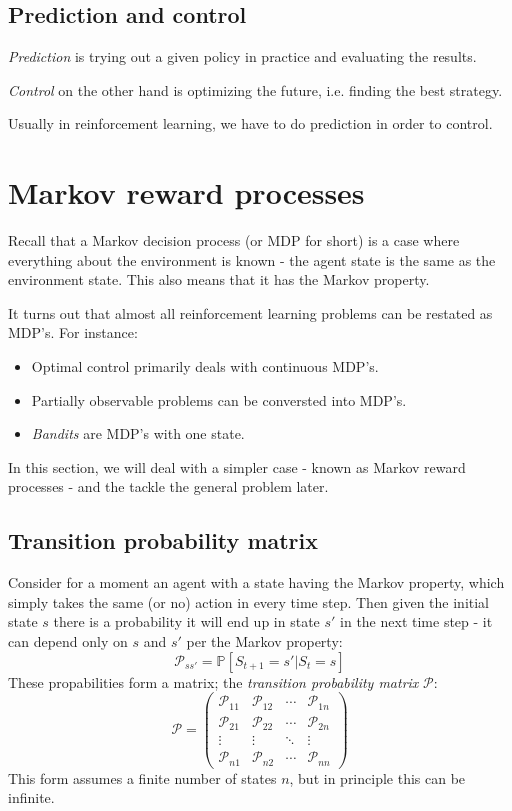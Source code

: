 \documentclass[12pt, a4paper]{article}
\numberwithin{equation}{section}
\begin{document}
\subsection{Prediction and control}
\textit{Prediction} is trying out a given policy in practice and evaluating the results.

\textit{Control} on the other hand is optimizing the future, i.e. finding the best strategy.

Usually in reinforcement learning, we have to do prediction in order to control.

\section{Markov reward processes}
Recall that a Markov decision process (or MDP for short) is a case where everything about the environment is known - the agent state is the same as the environment state. This also means that it has the Markov property.

It turns out that almost all reinforcement learning problems can be restated as MDP's. For instance:
\begin{itemize}
\item Optimal control primarily deals with continuous MDP's.
\item Partially observable problems can be conversted into MDP's.
\item \textit{Bandits} are MDP's with one state.
\end{itemize}
In this section, we will deal with a simpler case - known as Markov reward processes - and the tackle the general problem later.

\subsection{Transition probability matrix}
Consider for a moment an agent with a state having the Markov property, which simply takes the same (or no) action in every time step. Then given the initial state $s$ there is a probability it will end up in state $s'$ in the next time step - it can depend only on $s$ and $s'$ per the Markov property:
\begin{equation}
\mathcal{P}_{ss'}=\mathbb{P}[S_{t+1}=s'|S_t=s]
\end{equation}
These propabilities form a matrix; the \textit{transition probability matrix} $\mathcal{P}$:
\begin{equation}
\mathcal{P}=\begin{pmatrix}
\mathcal{P}_{11} & \mathcal{P}_{12} & \cdots & \mathcal{P}_{1n}\\
\mathcal{P}_{21} & \mathcal{P}_{22} & \cdots & \mathcal{P}_{2n}\\
\vdots & \vdots & \ddots & \vdots \\
\mathcal{P}_{n1} & \mathcal{P}_{n2} & \cdots & \mathcal{P}_{nn}
\end{pmatrix}
\end{equation}
This form assumes a finite number of states $n$, but in principle this can be infinite.
\end{document}
